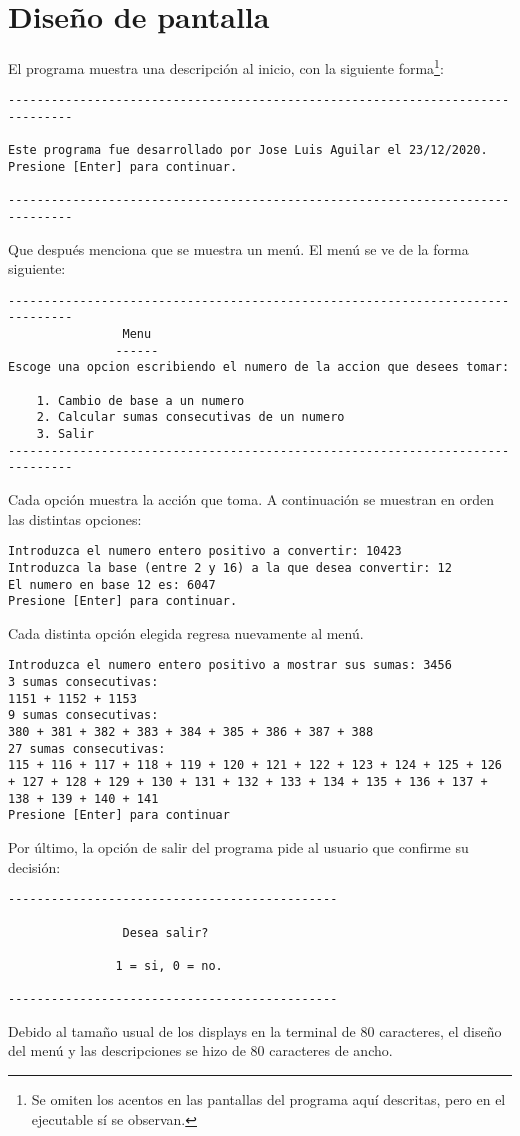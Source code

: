 \documentclass[conference]{IEEEtran}
\begin{document}
\section{Diseño de pantalla}
El programa muestra una descripción al inicio, con la siguiente forma\footnote{Se omiten los acentos en las pantallas del programa aquí descritas, pero en el ejecutable sí se observan.}:
\begin{lstlisting}[style=terminal]
-------------------------------------------------------------------------------

Este programa fue desarrollado por Jose Luis Aguilar el 23/12/2020.
Presione [Enter] para continuar.
    
-------------------------------------------------------------------------------
\end{lstlisting}
Que después menciona que se muestra un menú. El menú se ve de la forma siguiente:
\begin{lstlisting}[style=terminal]
-------------------------------------------------------------------------------
                Menu
               ------
Escoge una opcion escribiendo el numero de la accion que desees tomar:

    1. Cambio de base a un numero
    2. Calcular sumas consecutivas de un numero
    3. Salir
-------------------------------------------------------------------------------
\end{lstlisting}
Cada opción muestra la acción que toma. A continuación se muestran en orden las distintas opciones:
\begin{lstlisting}[style=terminal]
Introduzca el numero entero positivo a convertir: 10423
Introduzca la base (entre 2 y 16) a la que desea convertir: 12
El numero en base 12 es: 6047
Presione [Enter] para continuar.
\end{lstlisting}
Cada distinta opción elegida regresa nuevamente al menú.
\begin{lstlisting}[style=terminal]
Introduzca el numero entero positivo a mostrar sus sumas: 3456
3 sumas consecutivas: 
1151 + 1152 + 1153 
9 sumas consecutivas: 
380 + 381 + 382 + 383 + 384 + 385 + 386 + 387 + 388 
27 sumas consecutivas: 
115 + 116 + 117 + 118 + 119 + 120 + 121 + 122 + 123 + 124 + 125 + 126 + 127 + 128 + 129 + 130 + 131 + 132 + 133 + 134 + 135 + 136 + 137 + 138 + 139 + 140 + 141 
Presione [Enter] para continuar
\end{lstlisting}
Por último, la opción de salir del programa pide al usuario que confirme su decisión:
\begin{lstlisting}[style=terminal]
----------------------------------------------

                Desea salir?

               1 = si, 0 = no.

----------------------------------------------
\end{lstlisting}
Debido al tamaño usual de los displays en la terminal de 80 caracteres,
el diseño del menú y las descripciones se hizo de 80 caracteres de ancho.
\end{document}
